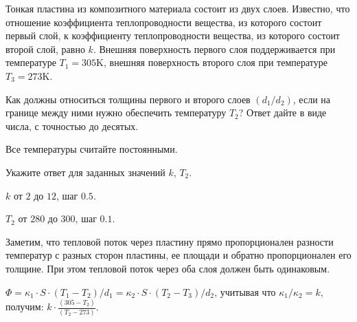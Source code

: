 
Тонкая пластина из композитного материала состоит из двух слоев. 
Известно, что отношение коэффициента теплопроводности вещества, из которого состоит первый слой, 
к коэффициенту теплопроводности вещества, из которого состоит второй слой, равно $k$. 
Внешняя поверхность первого слоя поддерживается при температуре \linebreak $T_1 = 305$K, внешняя поверхность 
второго слоя при температуре $T_3 = 273$K. 

Как должны относиться толщины первого и второго слоев $(d_1 / d_2)$, если на границе между ними нужно 
обеспечить температуру $T_2$? Ответ дайте в виде числа, с точностью до десятых. 

Все температуры считайте постоянными.

Укажите ответ для заданных значений $k$, $T_2$.

\paramSection

$k$ от $2$ до $12$, шаг $0.5$.

$T_2$ от $280$ до $300$, шаг $0.1$.

\solutionSection

Заметим, что тепловой поток через пластину прямо пропорционален разности температур с разных сторон пластины, 
ее площади и обратно пропорционален его толщине. При этом тепловой поток через оба слоя должен быть одинаковым.

$\Phi= \kappa_1 \cdot S \cdot (T_1-T_2)/d_1 = \kappa_2 \cdot S \cdot (T_2-T_3)/d_2$, учитывая что $\kappa_1 / \kappa_2 = k$, получим: $k \cdot \frac{(305-T_2)}{(T_2-273)}$.

